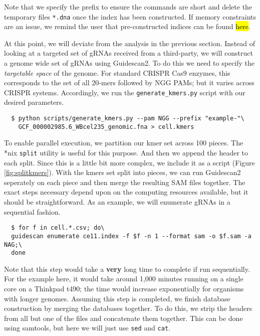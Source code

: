 \documentclass[11pt]{article}
\begin{document}
Note that we specify the prefix to ensure the commands are short and
delete the temporary files \texttt{*.dna} once the index has been
constructed. If memory constraints are an issue, we remind the user
that pre-constructed indices can be found \hl{here}.

At this point, we will deviate from the analysis in the previous
section. Instead of looking at a targeted set of gRNAs received from a
third-party, we will construct a genome wide set of gRNAs using
Guidescan2. To do this we need to specify the {\it targetable space}
of the genome. For standard CRISPR Cas9 enzymes, this corresponds to
the set of all 20-mers followed by NGG PAMs; but it varies across
CRISPR systems. Accordingly, we run the \texttt{generate\_kmers.py}
script with our desired parameters.

\begin{verbatim}
  $ python scripts/generate_kmers.py --pam NGG --prefix "example-"\
    GCF_000002985.6_WBcel235_genomic.fna > cell.kmers
\end{verbatim}

To enable parallel execution, we partition our kmer set across 100
pieces. The *nix \texttt{split} utility is useful for this
purpose. And then we append the header to each split. Since this is a
little bit more complex, we include it as a script (Figure
\ref{fig:splitkmers}). With the kmers set split into pieces, we can
run Guidescan2 seperately on each piece and then merge the resulting
SAM files together. The exact steps necessary depend upon on the
computing resources available, but it should be straightforward. As an
example, we will enumerate gRNAs in a sequential fashion.

\begin{verbatim}
  $ for f in cell.*.csv; do\
  guidescan enumerate ce11.index -f $f -n 1 --format sam -o $f.sam -a NAG;\
  done
\end{verbatim}

Note that this step would take a \textbf{very} long time to complete
if run sequentially. For the example here, it would take around 1,000
minutes running on a single core on a Thinkpad t490; the time would
increase exponentially for organisms with longer genomes. Assuming
this step is completed, we finish database construction by merging the
databases together. To do this, we strip the headers from all but one
of the files and concatenate them together. This can be done using
samtools, but here we will just use \texttt{sed} and \texttt{cat}.
\end{document}
